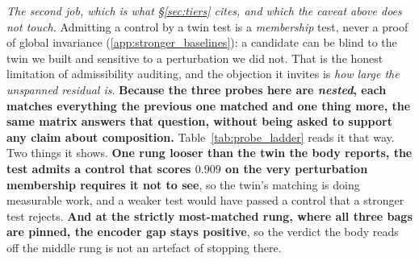 \emph{The second job, which is what \S\ref{sec:tiers} cites, and which the caveat above does not touch.} Admitting a control by a twin test is a \emph{membership} test, never a proof of global invariance (\ref{app:stronger_baselines}): a candidate can be blind to the twin we built and sensitive to a perturbation we did not. That is the honest limitation of admissibility auditing, and the objection it invites is \emph{how large the unspanned residual is}. \textbf{Because the three probes here are \emph{nested}, each matches everything the previous one matched and one thing more, the same matrix answers that question, without being asked to support any claim about composition.} Table~\ref{tab:probe_ladder} reads it that way. Two things it shows. \textbf{One rung looser than the twin the body reports, the test admits a control that scores $0.909$ on the very perturbation membership requires it not to see}, so the twin's matching is doing measurable work, and a weaker test would have passed a control that a stronger test rejects. \textbf{And at the strictly most-matched rung, where all three bags are pinned, the encoder gap stays positive}, so the verdict the body reads off the middle rung is not an artefact of stopping there.

